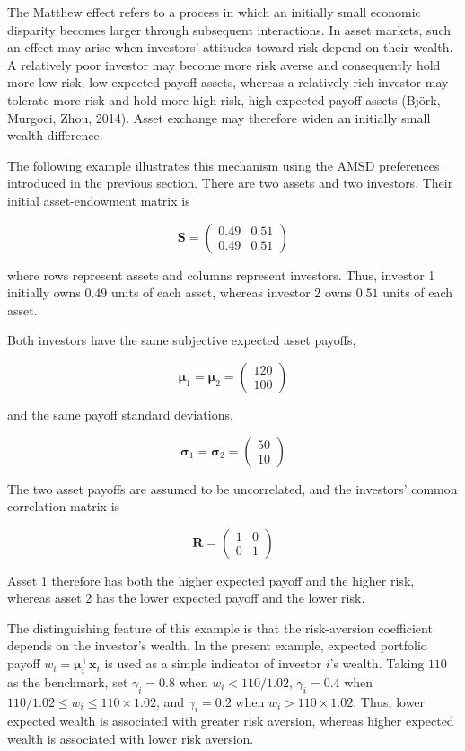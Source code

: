 \documentclass[
  letterpaper,
  DIV=11,
  numbers=noendperiod]{scrreprt}
\begin{document}
The Matthew effect refers to a process in which an initially small
economic disparity becomes larger through subsequent interactions. In
asset markets, such an effect may arise when investors' attitudes toward
risk depend on their wealth. A relatively poor investor may become more
risk averse and consequently hold more low-risk, low-expected-payoff
assets, whereas a relatively rich investor may tolerate more risk and
hold more high-risk, high-expected-payoff assets (Björk, Murgoci, Zhou,
2014). Asset exchange may therefore widen an initially small wealth
difference.

The following example illustrates this mechanism using the AMSD
preferences introduced in the previous section. There are two assets and
two investors. Their initial asset-endowment matrix is

\[
\mathbf S=
\begin{pmatrix}
0.49&0.51\\
0.49&0.51
\end{pmatrix}
\]

where rows represent assets and columns represent investors. Thus,
investor 1 initially owns \(0.49\) units of each asset, whereas investor
2 owns \(0.51\) units of each asset.

Both investors have the same subjective expected asset payoffs,

\[
\boldsymbol{\mu}_1
=
\boldsymbol{\mu}_2
=
\begin{pmatrix}
120\\
100
\end{pmatrix}
\]

and the same payoff standard deviations,

\[
\boldsymbol{\sigma}_1
=
\boldsymbol{\sigma}_2
=
\begin{pmatrix}
50\\
10
\end{pmatrix}
\]

The two asset payoffs are assumed to be uncorrelated, and the investors'
common correlation matrix is

\[
\mathbf R=
\begin{pmatrix}
1&0\\
0&1
\end{pmatrix}
\]

Asset 1 therefore has both the higher expected payoff and the higher
risk, whereas asset 2 has the lower expected payoff and the lower risk.

The distinguishing feature of this example is that the risk-aversion
coefficient depends on the investor's wealth. In the present example,
expected portfolio payoff \(w_i=\boldsymbol{\mu}_i^\top\mathbf x_i\) is
used as a simple indicator of investor \(i\)'s wealth. Taking \(110\) as
the benchmark, set \(\gamma_i=0.8\) when \(w_i<110/1.02\),
\(\gamma_i=0.4\) when \(110/1.02\leq w_i\leq110\times1.02\), and
\(\gamma_i=0.2\) when \(w_i>110\times1.02\). Thus, lower expected wealth
is associated with greater risk aversion, whereas higher expected wealth
is associated with lower risk aversion.
\end{document}
